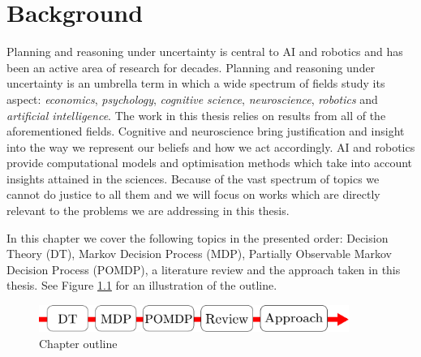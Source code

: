 \chapter{Background}

Planning and reasoning under uncertainty is central to AI and robotics and has 
been an active area of research for decades. Planning and reasoning under uncertainty is an umbrella term in which a
wide spectrum of fields study its aspect: \textit{economics}, \textit{psychology}, \textit{cognitive science}, \textit{neuroscience},
\textit{robotics} and \textit{artificial intelligence}. 
The work in this thesis relies on results from all of the aforementioned fields. Cognitive and neuroscience 
bring justification and insight into the way we represent our beliefs and how we act accordingly. AI and
robotics provide computational models and optimisation methods which take into account insights attained in the sciences.
Because of the vast spectrum of topics we cannot do justice to all them and we will focus on works which are directly 
relevant to the problems we are addressing in this thesis.


In this chapter we cover the following topics in the presented order: Decision Theory (DT), Markov Decision Process (MDP), 
Partially Observable Markov Decision Process (POMDP), a literature review and the approach taken 
in this thesis. See Figure \ref{fig:ch2_outline} for an illustration of the outline.
\begin{figure}[h]
 \centering
 \includegraphics[width=0.9\textwidth]{./ch2-Background/Figures/chap_overview.pdf}
  \caption{Chapter outline}
  \label{fig:ch2_outline}
\end{figure}

